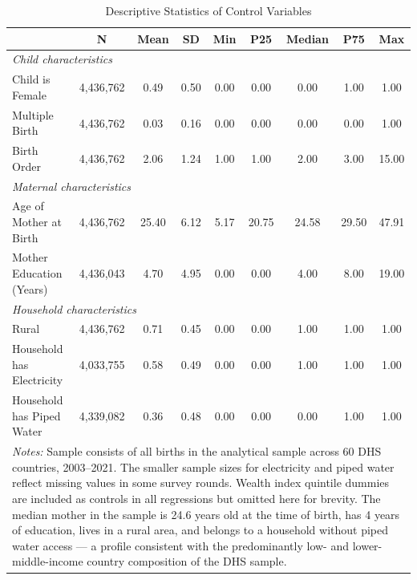 


\begin{table}[htbp]
\centering
\caption{Descriptive Statistics of Control Variables}
\label{tab:descr}
\begin{tabular}{lcccccccc}
\toprule
 & N & Mean & SD & Min & P25 & Median & P75 & Max \\
\midrule
\multicolumn{9}{l}{\textit{Child characteristics}} \\
Child is Female        & 4{,}436{,}762 & 0.49 & 0.50 & 0.00 & 0.00 & 0.00 & 1.00 & 1.00 \\
Multiple Birth         & 4{,}436{,}762 & 0.03 & 0.16 & 0.00 & 0.00 & 0.00 & 0.00 & 1.00 \\
Birth Order            & 4{,}436{,}762 & 2.06 & 1.24 & 1.00 & 1.00 & 2.00 & 3.00 & 15.00 \\
\midrule
\multicolumn{9}{l}{\textit{Maternal characteristics}} \\
Age of Mother at Birth & 4{,}436{,}762 & 25.40 & 6.12 & 5.17 & 20.75 & 24.58 & 29.50 & 47.91 \\
Mother Education (Years) & 4{,}436{,}043 & 4.70 & 4.95 & 0.00 & 0.00 & 4.00 & 8.00 & 19.00 \\
\midrule
\multicolumn{9}{l}{\textit{Household characteristics}} \\
Rural                  & 4{,}436{,}762 & 0.71 & 0.45 & 0.00 & 0.00 & 1.00 & 1.00 & 1.00 \\
Household has Electricity & 4{,}033{,}755 & 0.58 & 0.49 & 0.00 & 0.00 & 1.00 & 1.00 & 1.00 \\
Household has Piped Water & 4{,}339{,}082 & 0.36 & 0.48 & 0.00 & 0.00 & 0.00 & 1.00 & 1.00 \\
\bottomrule
\multicolumn{9}{p{14cm}}{\footnotesize \textit{Notes:} Sample consists of 
all births in the analytical sample across 60 DHS countries, 2003--2021. 
The smaller sample sizes for electricity and piped water reflect missing 
values in some survey rounds. Wealth index quintile dummies are included 
as controls in all regressions but omitted here for brevity. The median 
mother in the sample is 24.6 years old at the time of birth, has 4 years 
of education, lives in a rural area, and belongs to a household without 
piped water access — a profile consistent with the predominantly low- and 
lower-middle-income country composition of the DHS sample.} \\
\end{tabular}
\end{table}